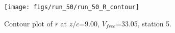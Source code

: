 \begin{figure}[H]
\centering
\texttt{[image: figs/run\_50/run\_50\_R\_contour]}
\caption{Contour plot of $\overline{r}$ at $z/c$=9.00, $V_{free}$=33.05, station 5.}
\label{fig:run_50_R_contour}
\end{figure}


